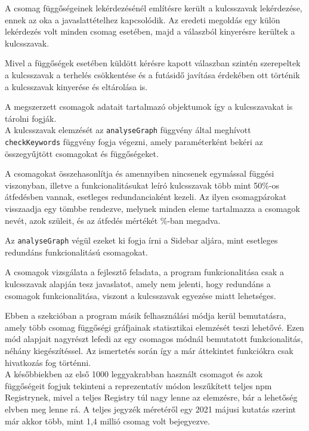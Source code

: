 A csomag függőségeinek lekérdezésénél említésre került a kulcsszavak lekérdezése, ennek az oka a javaslattételhez kapcsolódik. Az eredeti megoldás egy külön lekérdezés volt minden csomag esetében, majd a válaszból kinyerésre kerültek a kulcsszavak. 

Mivel a függőségek esetében küldött kérésre kapott válaszban szintén szerepeltek a kulcsszavak a terhelés csökkentése és a futásidő javítása érdekében ott történik a kulcsszavak kinyerése és eltárolása is.

A megszerzett csomagok adatait tartalmazó objektumok így a kulcsszavakat is tárolni fogják.\\

A kulcsszavak elemzését az \texttt{analyseGraph} függvény által meghívott \texttt{checkKeywords} függvény fogja végezni, amely paraméterként bekéri az összegyűjtött csomagokat és függőségeket.

A csomagokat összehasonlítja és amennyiben nincsenek egymással függési viszonyban, illetve a funkcionalitásukat leíró kulcsszavak több mint 50\%-os átfedésben vannak, esetleges redundanciaként kezeli.
Az ilyen csomagpárokat visszaadja egy tömbbe rendezve, melynek minden eleme tartalmazza a csomagok nevét, azok szüleit, és az átfedés mértékét \%-ban megadva.

Az \texttt{analyseGraph} végül ezeket ki fogja írni a Sidebar aljára, mint esetleges redundáns funkcionalitású csomagokat.

A csomagok vizsgálata a fejlesztő feladata, a program funkcionalitása csak a kulcsszavak alapján tesz javaslatot, amely nem jelenti, hogy redundáns a csomagok funkcionalitása, viszont a kulcsszavak egyezése miatt lehetséges.

\pagebreak 


Ebben a szekcióban a program másik felhasználási módja kerül bemutatásra, amely több csomag függőségi gráfjainak statisztikai elemzését teszi lehetővé.
Ezen mód alapjait nagyrészt lefedi az egy csomagos módnál bemutatott funkcionalitás, néhány kiegészítéssel. Az ismertetés során így a már áttekintet funkciókra csak hivatkozás fog történni.\\
 
A későbbiekben az első 1000 leggyakrabban használt csomagot és azok függőségeit fogjuk tekinteni a reprezentatív módon leszűkített teljes npm Registrynek, mivel a teljes Registry túl nagy lenne az elemzésre, bár a lehetőség elvben meg lenne rá. A teljes jegyzék méretéről egy 2021 májusi kutatás szerint már akkor több, mint 1,4 millió csomag volt bejegyezve. \cite{npm-size}\\

